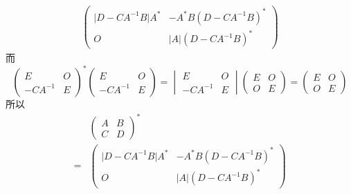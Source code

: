 \begin{enumerate}
\begin{enumerate}
\begin{align*}
\begin{pmatrix}
                              \lvert D-CA^{-1}B \rvert A^* & -A^*B(D-CA^{-1}B)^*            \\
                              O                            & \lvert A \rvert (D-CA^{-1}B)^*
                          \end{pmatrix}
                    \end{align*}
                    而
                    \[\begin{pmatrix}
                            E        & O \\
                            -CA^{-1} & E
                        \end{pmatrix}^* \begin{pmatrix}
                            E        & O \\
                            -CA^{-1} & E
                        \end{pmatrix} = \begin{vmatrix}
                            E        & O \\
                            -CA^{-1} & E
                        \end{vmatrix} \begin{pmatrix}
                            E & O \\
                            O & E
                        \end{pmatrix} = \begin{pmatrix}
                            E & O \\
                            O & E
                        \end{pmatrix}\]
                    所以
                    \begin{align*}
                            & \begin{pmatrix}
                                  A & B \\
                                  C & D
                              \end{pmatrix}^*                                                                         \\
                        ={} & \begin{pmatrix}
                                  \lvert D-CA^{-1}B \rvert A^* & -A^*B(D-CA^{-1}B)^*            \\
                                  O                            & \lvert A \rvert (D-CA^{-1}B)^*
                              \end{pmatrix}

\end{align*}
\end{enumerate}
\end{enumerate}
